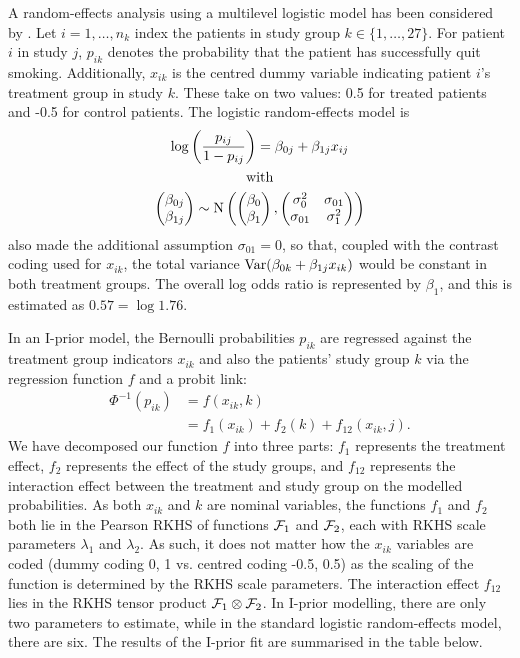 \documentclass[a4paper,showframe,11pt]{report}\usepackage[]{graphicx}\usepackage[]{color}
\begin{document}
A random-effects analysis using a multilevel logistic model has been considered by \citet{agresti2000tutorial}.
Let $i=1,\dots,n_k$ index the patients in study group $k \in \{1,\dots,27\}$.
For patient $i$ in study $j$, $p_{ik}$ denotes the probability that the patient has successfully quit smoking.
Additionally, $x_{ik}$ is the centred dummy variable indicating patient $i$'s treatment group in study $k$.
These take on two values: 0.5 for treated patients and -0.5 for control patients.
The logistic random-effects model is
\begin{gather*}
  \log \left( \frac{p_{ij}}{1-p_{ij}} \right) = \beta_{0j} + \beta_{1j}x_{ij} \\
  \text{with} \\
  \begin{pmatrix} \beta_{0j} \\ \beta_{1j} \end{pmatrix}
  \sim \operatorname{N} \left(
  \begin{pmatrix} \beta_0 \\ \beta_1 \end{pmatrix},
  \begin{pmatrix} \sigma_0^2 & \sigma_{01} \\ \sigma_{01} & \sigma_1^2 \\ \end{pmatrix}
  \right)
\end{gather*}
\citet{agresti2000tutorial} also made the additional assumption $\sigma_{01} = 0$, so that, coupled with the contrast coding used for $x_{ik}$, the total variance $\operatorname{Var}(\beta_{0k} + \beta_{1j}x_{ik})$ would be constant in both treatment groups.
The overall log odds ratio is represented by $\beta_1$, and this is estimated as $0.57 = \log 1.76$.

In an I-prior model, the Bernoulli probabilities $p_{ik}$ are regressed against the treatment group indicators $x_{ik}$ and also the patients' study group $k$ via the regression function $f$ and a probit link:
\begin{align*}
  \Phi^{-1}(p_{ik})
  &= f(x_{ik}, k) \\
  &= f_1(x_{ik}) + f_2(k) + f_{12}(x_{ik}, j).
\end{align*}
We have decomposed our function $f$ into three parts: $f_1$ represents the treatment effect, $f_2$ represents the effect of the study groups, and $f_{12}$ represents the interaction effect between the treatment and study group on the modelled probabilities.
As both $x_{ik}$ and $k$ are nominal variables, the functions $f_1$ and $f_2$ both lie in the Pearson RKHS of functions ${\mathcal F}_1$ and ${\mathcal F}_2$, each with RKHS scale parameters $\lambda_1$ and $\lambda_2$.
As such, it does not matter how the $x_{ik}$ variables are coded (dummy coding 0, 1 vs. centred coding -0.5, 0.5) as the scaling of the function is determined by the RKHS scale parameters.
The interaction effect $f_{12}$ lies in the RKHS tensor product ${\mathcal F}_1 \otimes {\mathcal F}_2$.
In I-prior modelling, there are only two parameters to estimate, while in the standard logistic random-effects model, there are six.
The results of the I-prior fit are summarised in the table below.
\end{document}
